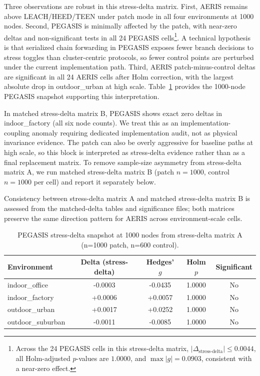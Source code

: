 ﻿\documentclass[sensors,article,submit,moreauthors,pdftex]{Definitions/mdpi}
\begin{document}
Three observations are robust in this stress-delta matrix. First, AERIS remains above LEACH/HEED/TEEN under patch mode in all four environments at 1000 nodes. Second, PEGASIS is minimally affected by the patch, with near-zero deltas and non-significant tests in all 24 PEGASIS cells\footnote{Across the 24 PEGASIS cells in this stress-delta matrix, \(|\Delta_{\text{stress-delta}}| \le 0.0044\), all Holm-adjusted \(p\)-values are \(1.0000\), and \(\max |g| = 0.0903\), consistent with a near-zero effect.}. A technical hypothesis is that serialized chain forwarding in PEGASIS exposes fewer branch decisions to stress toggles than cluster-centric protocols, so fewer control points are perturbed under the current implementation path. Third, AERIS patch-minus-control deltas are significant in all 24 AERIS cells after Holm correction, with the largest absolute drop in outdoor\_urban at high scale. Table~\ref{tab:s9_pegasis_1000} provides the 1000-node PEGASIS snapshot supporting this interpretation.

In matched stress-delta matrix B, PEGASIS shows exact zero deltas in indoor\_factory (all six node counts). We treat this as an implementation-coupling anomaly requiring dedicated implementation audit, not as physical invariance evidence. The patch can also be overly aggressive for baseline paths at high scale, so this block is interpreted as stress-delta evidence rather than as a final replacement matrix. To remove sample-size asymmetry from stress-delta matrix A, we run matched stress-delta matrix B (patch \(n=1000\), control \(n=1000\) per cell) and report it separately below.

Consistency between stress-delta matrix A and matched stress-delta matrix B is assessed from the matched-delta tables and significance files; both matrices preserve the same direction pattern for AERIS across environment-scale cells.

\begin{table}[H]
\caption{PEGASIS stress-delta snapshot at 1000 nodes from stress-delta matrix A (n=1000 patch, n=600 control).}
\label{tab:s9_pegasis_1000}
\centering
\begin{tabular}{lcccc}
\toprule
Environment & Delta (stress-delta) & Hedges' $g$ & Holm $p$ & Significant \\
\midrule
indoor\_office    & -0.0003 & -0.0435 & 1.0000 & No \\
indoor\_factory   & +0.0006 & +0.0057 & 1.0000 & No \\
outdoor\_urban    & +0.0017 & +0.0252 & 1.0000 & No \\
outdoor\_suburban & -0.0011 & -0.0085 & 1.0000 & No \\
\bottomrule
\end{tabular}
\end{table}
\end{document}
